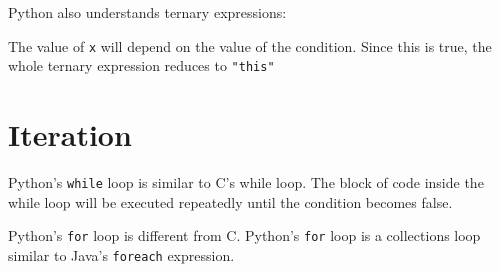 Python also understands ternary expressions:

\begin{Shaded}
\begin{Highlighting}[]
\OperatorTok{=}     
\end{Highlighting}
\end{Shaded}

\begin{Shaded}
\begin{Highlighting}[]
\end{Highlighting}
\end{Shaded}

The value of \texttt{x} will depend on the value of the condition. Since
this is true, the whole ternary expression reduces to \texttt{"this"}

\section{Iteration}\label{python-introduction.md__iteration}

Python's \texttt{while} loop is similar to C's while loop. The block of
code inside the while loop will be executed repeatedly until the
condition becomes false.

\begin{Shaded}
\begin{Highlighting}[]
\OperatorTok{=} 
\OperatorTok{\textless{}} \NormalTok{:}
\OperatorTok{+=}
\end{Highlighting}
\end{Shaded}

\begin{Shaded}
\begin{Highlighting}[]
\end{Highlighting}
\end{Shaded}

Python's \texttt{for} loop is different from C. Python's \texttt{for}
loop is a collections loop similar to Java's \texttt{foreach}
expression.

\begin{Shaded}
\begin{Highlighting}[]
\NormalTok{ [}\NormalTok{,}\NormalTok{,}\NormalTok{,}\NormalTok{]:}
\end{Highlighting}
\end{Shaded}

